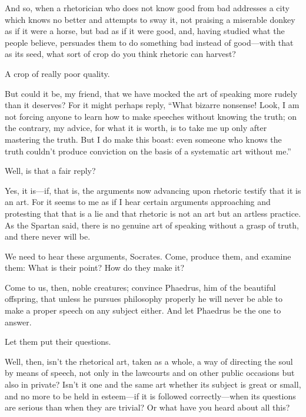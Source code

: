 \saysocrates And so, when a rhetorician who does not know good from bad
addresses a city which knows no better and attempts to sway it, not
praising a miserable donkey as if it were a horse, but bad as if it were
good, and, having studied what the people believe, persuades them to do
something bad instead of good---with that as its seed, what sort of crop 
do you think rhetoric can harvest?

\sayphaedrus A crop of really poor quality.

\saysocrates But could it be, my friend, that we have mocked the art of
speaking more rudely than it deserves? For it might perhaps reply, “What
bizarre nonsense! Look, I am not forcing anyone to learn how to make
speeches without knowing the truth; on the contrary, my advice, for what
it is worth, is to take me up only after mastering the truth. But I do
make this boast: even someone who knows the truth couldn’t produce
conviction on the basis of a systematic art without me.”

\sayphaedrus Well, is that a fair reply?

\saysocrates Yes, it is---if, that is, the arguments now advancing upon
rhetoric testify that it is an art. For it seems to me as if I hear
certain arguments approaching and protesting that that is a lie and that
rhetoric is not an art but an artless
practice. As the
Spartan said, there is no genuine art of speaking without a grasp of
truth, and there never will be.

\sayphaedrus We need to hear these arguments, Socrates. Come, produce
them, and examine them: What is their point? How do they
make it?

\saysocrates Come to us, then, noble creatures; convince Phaedrus, him of
the beautiful
offspring, that unless
he pursues philosophy properly he will never be able to make a proper
speech on any subject either. And let Phaedrus be the one to answer.

\sayphaedrus Let them put their questions.

\saysocrates Well, then, isn’t the rhetorical art, taken as a whole, a way
of directing the soul by means of speech, not only in the lawcourts and
on other public occasions but also in private? Isn’t it one and the same
art whether its subject is great or small, and no more to be held in
esteem---if it is followed correctly---when its questions are
serious than when they are trivial? Or what have you heard about all
this?

